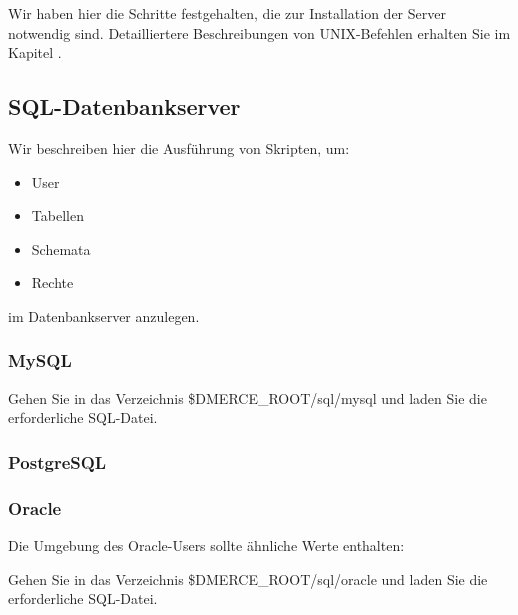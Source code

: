Wir haben hier die Schritte festgehalten, die zur Installation
der Server notwendig sind. Detailliertere Beschreibungen von 
UNIX-Befehlen erhalten Sie im Kapitel .

\subsection{SQL-Datenbankserver}

Wir beschreiben hier die Ausf\"uhrung von Skripten, um:

\begin{itemize}
\item User
\item Tabellen
\item Schemata
\item Rechte
\end{itemize}

im Datenbankserver anzulegen.

\subsubsection{MySQL}

Gehen Sie in das Verzeichnis \$DMERCE\_ROOT/sql/mysql und laden
Sie die erforderliche SQL-Datei.\\


\subsubsection{PostgreSQL}
\subsubsection{Oracle}

Die Umgebung des Oracle-Users sollte \"ahnliche Werte enthalten:


Gehen Sie in das Verzeichnis \$DMERCE\_ROOT/sql/oracle und laden
Sie die erforderliche SQL-Datei.

